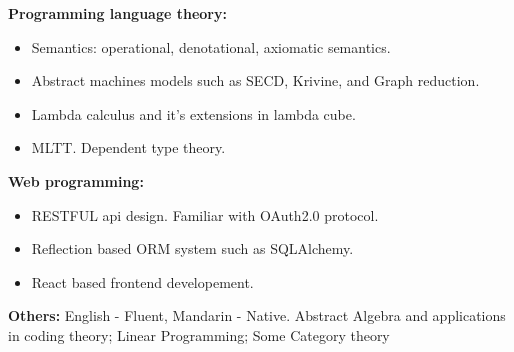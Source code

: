 \documentclass{resume}
\begin{document}
    \textbf{Programming language theory: }
    \begin{itemize}
        \item Semantics: operational, denotational, axiomatic semantics.
        \item Abstract machines models such as SECD, Krivine, and Graph reduction.
        \item Lambda calculus and it's extensions in lambda cube.
        \item MLTT. Dependent type theory.
    \end{itemize}

    \textbf{Web programming: }
    \begin{itemize}
        \item RESTFUL api design. Familiar with OAuth2.0 protocol.
        \item Reflection based ORM system such as SQLAlchemy.
        \item React based frontend developement.
    \end{itemize}

    \textbf{Others: }
        English - Fluent, Mandarin - Native.
        Abstract Algebra and applications in coding theory; Linear Programming; Some Category theory
\end{document}
